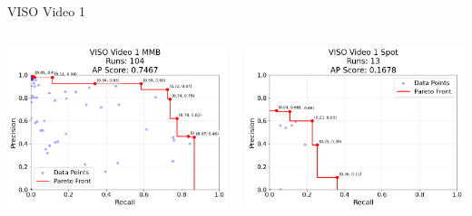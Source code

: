 \begin{frame}{VISO Video 1}
    \begin{columns}
        \begin{column}{0.48\textwidth}
            \centering
            \includegraphics[width=\textwidth,height=0.7\textheight,keepaspectratio]{images/bom/VISO_Video_1_MMB_104.png}
        \end{column}
        \begin{column}{0.48\textwidth}
            \centering
            \includegraphics[width=\textwidth,height=0.7\textheight,keepaspectratio]{images/bom/VISO_Video_1_Spot_13.png}
        \end{column}
    \end{columns}
\end{frame}

